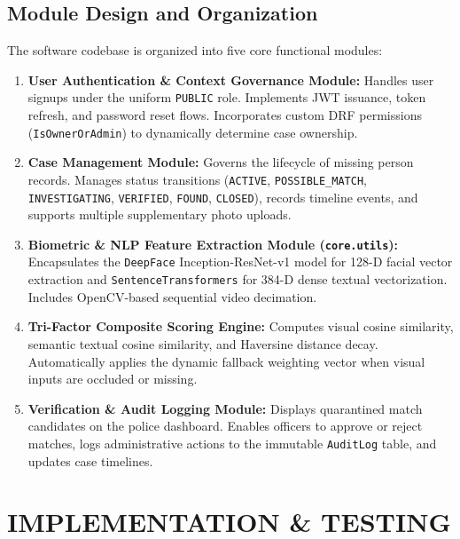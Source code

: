 \documentclass[12pt,a4paper]{report}
\begin{document}
\section{Module Design and Organization}
The software codebase is organized into five core functional modules:
\begin{enumerate}
    \item \textbf{User Authentication \& Context Governance Module:} Handles user signups under the uniform \texttt{PUBLIC} role. Implements JWT issuance, token refresh, and password reset flows. Incorporates custom DRF permissions (\texttt{IsOwnerOrAdmin}) to dynamically determine case ownership.
    \item \textbf{Case Management Module:} Governs the lifecycle of missing person records. Manages status transitions (\texttt{ACTIVE}, \texttt{POSSIBLE\_MATCH}, \texttt{INVESTIGATING}, \texttt{VERIFIED}, \texttt{FOUND}, \texttt{CLOSED}), records timeline events, and supports multiple supplementary photo uploads.
    \item \textbf{Biometric \& NLP Feature Extraction Module (\texttt{core.utils}):} Encapsulates the \texttt{DeepFace} Inception-ResNet-v1 model for 128-D facial vector extraction and \texttt{SentenceTransformers} for 384-D dense textual vectorization. Includes OpenCV-based sequential video decimation.
    \item \textbf{Tri-Factor Composite Scoring Engine:} Computes visual cosine similarity, semantic textual cosine similarity, and Haversine distance decay. Automatically applies the dynamic fallback weighting vector when visual inputs are occluded or missing.
    \item \textbf{Verification \& Audit Logging Module:} Displays quarantined match candidates on the police dashboard. Enables officers to approve or reject matches, logs administrative actions to the immutable \texttt{AuditLog} table, and updates case timelines.
\end{enumerate}


\chapter{IMPLEMENTATION \& TESTING}
\end{document}
